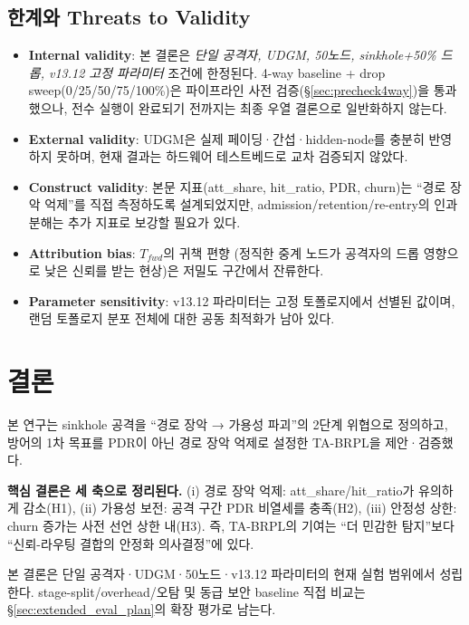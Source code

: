\documentclass[12pt,a4paper]{article}
\begin{document}
\subsection{한계와 Threats to Validity}

\begin{itemize}
  \item \textbf{Internal validity}: 본 결론은
    \emph{단일 공격자, UDGM, 50노드, sinkhole+50\% 드롭, v13.12 고정 파라미터}
    조건에 한정된다.
    4-way baseline + drop sweep(0/25/50/75/100\%)은
    파이프라인 사전 검증(\S\ref{sec:precheck4way})을 통과했으나,
    전수 실행이 완료되기 전까지는 최종 우열 결론으로 일반화하지 않는다.
  \item \textbf{External validity}: UDGM은 실제 페이딩·간섭·hidden-node를
    충분히 반영하지 못하며, 현재 결과는 하드웨어 테스트베드로 교차 검증되지 않았다.
  \item \textbf{Construct validity}: 본문 지표(att\_share, hit\_ratio, PDR, churn)는
    ``경로 장악 억제''를 직접 측정하도록 설계되었지만,
    admission/retention/re-entry의 인과 분해는 추가 지표로 보강할 필요가 있다.
  \item \textbf{Attribution bias}: $T_{fwd}$의 귀책 편향
    (정직한 중계 노드가 공격자의 드롭 영향으로 낮은 신뢰를 받는 현상)은
    저밀도 구간에서 잔류한다.
  \item \textbf{Parameter sensitivity}: v13.12 파라미터는 고정 토폴로지에서
    선별된 값이며, 랜덤 토폴로지 분포 전체에 대한 공동 최적화가 남아 있다.
\end{itemize}


\section{결론}
\label{sec:conclusion}

본 연구는 sinkhole 공격을 ``경로 장악 → 가용성 파괴''의 2단계 위협으로
정의하고, 방어의 1차 목표를 PDR이 아닌 경로 장악 억제로 설정한
TA-BRPL을 제안·검증했다.

\textbf{핵심 결론은 세 축으로 정리된다.}
(i) 경로 장악 억제: att\_share/hit\_ratio가 유의하게 감소(H1),
(ii) 가용성 보전: 공격 구간 PDR 비열세를 충족(H2),
(iii) 안정성 상한: churn 증가는 사전 선언 상한 내(H3).
즉, TA-BRPL의 기여는 ``더 민감한 탐지''보다
``신뢰-라우팅 결합의 안정화 의사결정''에 있다.

본 결론은 단일 공격자·UDGM·50노드·v13.12 파라미터의
현재 실험 범위에서 성립한다.
stage-split/overhead/오탐 및 동급 보안 baseline 직접 비교는
\S\ref{sec:extended_eval_plan}의 확장 평가로 남는다.
\end{document}
